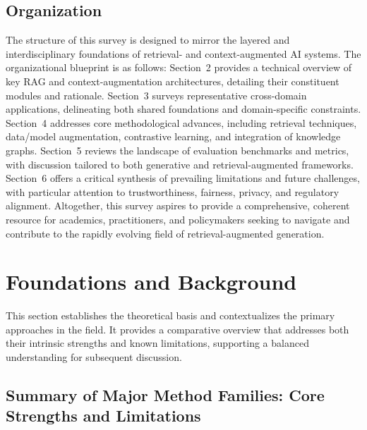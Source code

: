 \documentclass[sigconf]{acmart}
\begin{document}
\subsection{Organization}

The structure of this survey is designed to mirror the layered and interdisciplinary foundations of retrieval- and context-augmented AI systems. The organizational blueprint is as follows:
Section~2 provides a technical overview of key RAG and context-augmentation architectures, detailing their constituent modules and rationale.
Section~3 surveys representative cross-domain applications, delineating both shared foundations and domain-specific constraints.
Section~4 addresses core methodological advances, including retrieval techniques, data/model augmentation, contrastive learning, and integration of knowledge graphs.
Section~5 reviews the landscape of evaluation benchmarks and metrics, with discussion tailored to both generative and retrieval-augmented frameworks.
Section~6 offers a critical synthesis of prevailing limitations and future challenges, with particular attention to trustworthiness, fairness, privacy, and regulatory alignment.
Altogether, this survey aspires to provide a comprehensive, coherent resource for academics, practitioners, and policymakers seeking to navigate and contribute to the rapidly evolving field of retrieval-augmented generation.

\section{Foundations and Background}

This section establishes the theoretical basis and contextualizes the primary approaches in the field. It provides a comparative overview that addresses both their intrinsic strengths and known limitations, supporting a balanced understanding for subsequent discussion.

\subsection*{Summary of Major Method Families: Core Strengths and Limitations}
\end{document}
